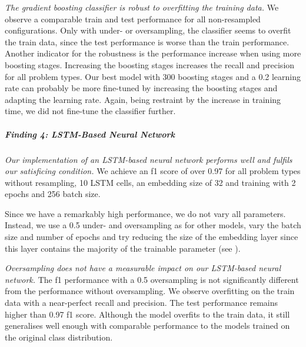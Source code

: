 \textit{The gradient boosting classifier is robust to overfitting the training data.} We observe a comparable train and test performance for all non-resampled configurations. Only with under- or oversampling, the classifier seems to overfit the train data, since the test performance is worse than the train performance. 
Another indicator for the robustness is the performance increase when using more boosting stages. Increasing the boosting stages increases the recall and precision for all problem types. Our best model with 300 boosting stages and a 0.2 learning rate can probably be more fine-tuned by increasing the boosting stages and adapting the learning rate. Again, being restraint by the increase in training time, we did not fine-tune the classifier further.

\begin{center}
\end{center}


\subparagraph{Finding 4: LSTM-Based Neural Network}
\textit{Our implementation of an LSTM-based neural network performs well and fulfils our satisficing condition.} We achieve an f1 score of over 0.97 for all problem types without resampling, 10 LSTM cells, an embedding size of 32 and training with 2 epochs and 256 batch size. 


Since we have a remarkably high performance, we do not vary all parameters. Instead, we use a 0.5 under- and oversampling as for other models, vary the batch size and number of epochs and try reducing the size of the embedding layer since this layer contains the majority of the trainable parameter (see ).


\textit{Oversampling does not have a measurable impact on our LSTM-based neural network.} The f1 performance with a 0.5 oversampling is not significantly different from the performance without oversampling. We observe overfitting on the train data with a near-perfect recall and precision. The test performance remains higher than 0.97 f1 score. Although the model overfits to the train data, it still generalises well enough with comparable performance to the models trained on the original class distribution.



